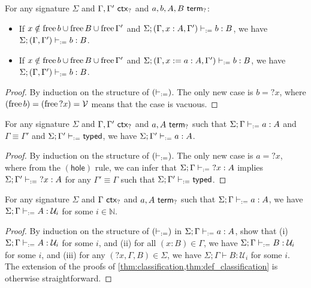 \documentclass[twoside]{report}
\begin{document}
\begin{proposition}[Strengthening]
\label{thm:hole_strengthening}
For any signature $\Sigma$ and $\Gamma, \Gamma' \ \mathsf{ctx}_{?}$ and $a, b, A, B \ \mathsf{term}_{?}$:
\begin{itemize}[noitemsep]
    \item If $x \notin \operatorname{free} b \cup \operatorname{free} B \cup \operatorname{free}{\Gamma'}$ and $\Sigma; (\Gamma, x : A, \Gamma') \vdash_{:=} b : B$, we have $\Sigma; (\Gamma, \Gamma') \vdash_{:=} b : B$.
    \item If $x \notin \operatorname{free} b \cup \operatorname{free} B \cup \operatorname{free}{\Gamma'}$ and $\Sigma; (\Gamma, x := a : A, \Gamma') \vdash_{:=} b : B$, we have $\Sigma; (\Gamma, \Gamma') \vdash_{:=} b : B$.
\end{itemize}
\end{proposition}

\begin{proof}
By induction on the structure of $(\vdash_{:=})$. The only new case is $b = {?x}$, where $(\operatorname{free} b) = (\operatorname{free} {?x}) = \mathcal V$ means that the case is vacuous.
\end{proof}

\begin{proposition}
\label{thm:hole_context_conv}
For any signature $\Sigma$ and $\Gamma, \Gamma' \ \mathsf{ctx}_{?}$ and $a, A \ \mathsf{term}_{?}$ such that $\Sigma; \Gamma \vdash_{:=} a : A$ and $\Gamma \equiv \Gamma'$ and $\Sigma; \Gamma' \vdash_{:=} \mathsf{typed}$, we have $\Sigma; \Gamma' \vdash_{:=} a : A$.
\end{proposition}

\begin{proof}
By induction on the structure of $(\vdash_{:=})$. The only new case is $a = {?x}$, where from the $(\mathsf{hole})$ rule, we can infer that $\Sigma; \Gamma \vdash_{:=} {?x} : A$ implies $\Sigma; \Gamma' \vdash_{:=} {?x} : A$ for any $\Gamma' \equiv \Gamma$ such that $\Sigma; \Gamma' \vdash_{:=} \mathsf{typed}$.
\end{proof}

\begin{proposition}[Classification]
\label{thm:hole_classification}
For any signature $\Sigma$ and $\Gamma \ \mathsf{ctx}_{?}$ and $a, A \ \mathsf{term}_{?}$ such that $\Sigma; \Gamma \vdash_{:=} a : A$, we have $\Sigma; \Gamma \vdash_{:=} A : \mathcal U_i$ for some $i \in \mathbb N$.
\end{proposition}

\begin{proof}
By induction on the structure of $(\vdash_{:=})$ in $\Sigma; \Gamma \vdash_{:=} a : A$, show that (i) $\Sigma; \Gamma \vdash_{:=} A : \mathcal U_i$ for some $i$, and (ii) for all $(x : B) \in \Gamma$, we have $\Sigma; \Gamma \vdash_{:=} B : \mathcal U_i$ for some $i$, and (iii) for any $({?x}, \Gamma, B) \in \Sigma$, we have $\Sigma; \Gamma \vdash B : \mathcal U_i$ for some $i$. The extension of the proofs of \cref{thm:classification,thm:def_classification} is otherwise straightforward.
\end{proof}
\end{document}
